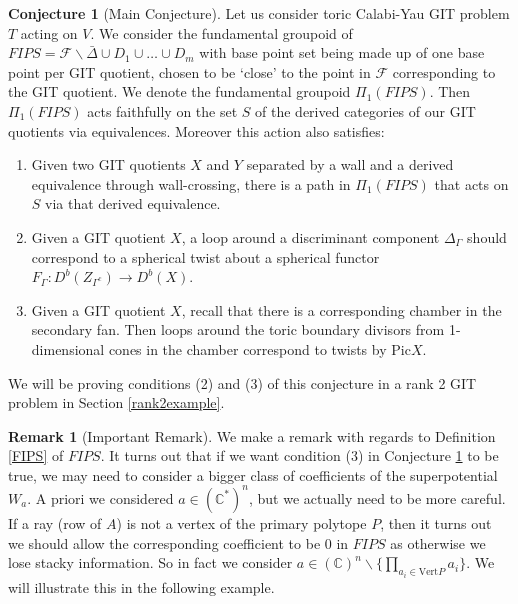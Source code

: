 \documentclass[oneside]{amsart}
\theoremstyle{definition}
\theoremstyle{definition}
\newtheorem{conjecture}{Conjecture}[section]
\theoremstyle{definition}
\theoremstyle{definition}
\newtheorem{remark}{Remark} [section]
\newcommand{\CC}{\mathbb{C}}
\newcommand{\Fs}{\mathcal{F}}
\begin{document}
\begin{conjecture}[Main Conjecture]
    \label{main}
    Let us consider toric Calabi-Yau GIT problem $T$ acting on $V$. We consider the fundamental groupoid of $FIPS= \Fs \backslash \bar{\Delta} \cup D_1 \cup \dots \cup D_m$ with base point set being made up of one base point per GIT quotient, chosen to be `close' to the point in $\Fs$ corresponding to the GIT quotient. We denote the fundamental groupoid $\Pi_1(FIPS)$. Then $\Pi_1(FIPS)$ acts faithfully on the set $S$ of the derived categories of our GIT quotients via equivalences. Moreover this action also satisfies:
    \begin{enumerate}
        \item Given two GIT quotients $X$ and $Y$ separated by a wall and a derived equivalence through wall-crossing, there is a path in $\Pi_1(FIPS)$ that acts on $S$ via that derived equivalence.
        \item Given a GIT quotient $X$, a loop around a discriminant component $\Delta_\Gamma$ should correspond to a spherical twist about a spherical functor $F_{\Gamma} : D^b(Z_{\Gamma^c}) \to D^b(X)$.
        \item Given a GIT quotient $X$, recall that there is a corresponding chamber in the secondary fan. Then loops around the toric boundary divisors from 1-dimensional cones in the chamber correspond to twists by $\text{Pic} X$.
    \end{enumerate}
\end{conjecture}
We will be proving conditions (2) and (3) of this conjecture in a rank 2 GIT problem in Section \ref{rank2example}.
\begin{remark}[Important Remark]
\label{stacky}
We make a remark with regards to Definition \ref{FIPS} of $FIPS$. It turns out that if we want condition (3) in Conjecture \ref{main} to be true, we may need to consider a bigger class of coefficients of the superpotential $W_a$. A priori we considered $a \in (\CC^*)^{n}$, but we actually need to be more careful. If a ray (row of $A$) is not a vertex of the primary polytope $P$, then it turns out we should allow the corresponding coefficient to be 0 in $FIPS$ as otherwise we lose stacky information. So in fact we consider $a \in (\CC)^{n} \backslash \{ \prod_{a_i\in \text{Vert}P} a_i \}$. We will illustrate this in the following example.
\end{remark}
\end{document}
